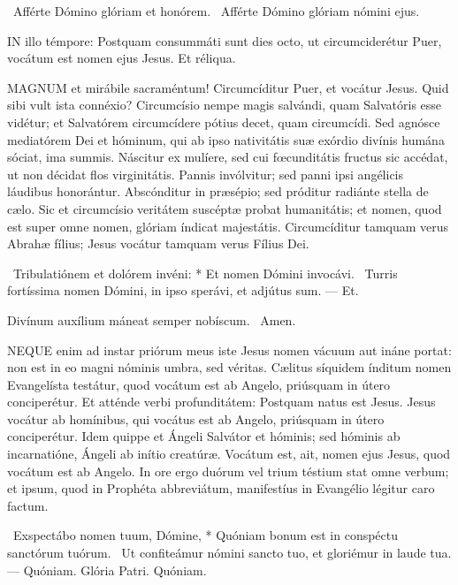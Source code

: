 \V\ Afférte Dómino glóriam et honórem. \R\ Afférte Dómino glóriam nómini ejus.



\lettrine[lines=2]{I}{N} illo témpore: Postquam consummáti sunt dies octo, ut circumciderétur Puer, vocátum est nomen ejus Jesus. Et réliqua.



\lettrine[lines=2]{M}{AGNUM} et mirábile sacraméntum! Circumcíditur Puer, et vocátur Jesus. Quid sibi vult ista connéxio? Circumcísio nempe magis salvándi, quam Salvatóris esse vidétur; et Salvatórem circumcídere pótius decet, quam circumcídi. Sed agnósce mediatórem Dei et hóminum, qui ab ipso nativitátis suæ exórdio divínis humána sóciat, ima summis. Náscitur ex mulíere, sed cui fœcunditátis fructus sic accédat, ut non décidat flos virginitátis. Pannis invólvitur; sed panni ipsi angélicis láudibus honorántur. Abscónditur in præsépio; sed próditur radiánte stella de cælo. Sic et circumcísio veritátem suscéptæ probat humanitátis; et nomen, quod est super omne nomen, glóriam índicat majestátis. Circumcíditur tamquam verus Abrahæ fílius; Jesus vocátur tamquam verus Fílius Dei.

\R\ Tribulatiónem et dolórem invéni: * Et nomen Dómini invocávi. \V\ Turris fortíssima nomen Dómini, in ipso sperávi, et adjútus sum. --- Et.

 Divínum auxílium máneat semper nobíscum. \R\ Amen.


\lettrine[lines=2]{N}{EQUE} enim ad instar priórum meus iste Jesus nomen vácuum aut ináne portat: non est in eo magni nóminis umbra, sed véritas. Cælitus síquidem índitum nomen Evangelísta testátur, quod vocátum est ab Angelo, priúsquam in útero conciperétur. Et atténde verbi profunditátem: Postquam natus est Jesus. Jesus vocátur ab homínibus, qui vocátus est ab Angelo, priúsquam in útero conciperétur. Idem quippe et Ángeli Salvátor et hóminis; sed hóminis ab incarnatióne, Ángeli ab inítio creatúræ. Vocátum est, ait, nomen ejus Jesus, quod vocátum est ab Angelo. In ore ergo duórum vel trium téstium stat omne verbum; et ipsum, quod in Prophéta abbreviátum, manifestíus in Evangélio légitur caro factum.

\R\ Exspectábo nomen tuum, Dómine, * Quóniam bonum est in conspéctu sanctórum tuórum. \V\ Ut confiteámur nómini sancto tuo, et gloriémur in laude tua. --- Quóniam. Glória Patri. Quóniam.

